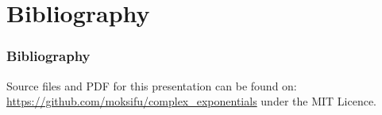 \documentclass{beamer}
\begin{document}
\section{Bibliography}
\begin{frame}
  \frametitle{Bibliography}
  \printbibliography

  Source files and PDF for this presentation can be found on:
  \url{https://github.com/moksifu/complex_exponentials}
  under the MIT Licence.
\end{frame}


\end{document}
